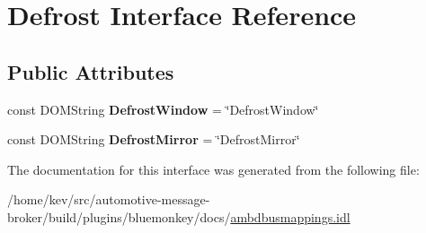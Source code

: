 \hypertarget{interfaceDefrost}{\section{Defrost Interface Reference}
\label{interfaceDefrost}
}
\subsection*{Public Attributes}
\begin{DoxyCompactItemize}
\item 
\hypertarget{interfaceDefrost_a93685913fb911c4acf5b7a9d1a5c438b}{const D\+O\+M\+String {\bfseries Defrost\+Window} = \char`\"{}Defrost\+Window\char`\"{}}\label{interfaceDefrost_a93685913fb911c4acf5b7a9d1a5c438b}

\item 
\hypertarget{interfaceDefrost_ab36b984c67951c8bf418dde8bfbd1c69}{const D\+O\+M\+String {\bfseries Defrost\+Mirror} = \char`\"{}Defrost\+Mirror\char`\"{}}\label{interfaceDefrost_ab36b984c67951c8bf418dde8bfbd1c69}

\end{DoxyCompactItemize}


The documentation for this interface was generated from the following file\+:\begin{DoxyCompactItemize}
\item 
/home/kev/src/automotive-\/message-\/broker/build/plugins/bluemonkey/docs/\hyperlink{ambdbusmappings_8idl}{ambdbusmappings.\+idl}\end{DoxyCompactItemize}
